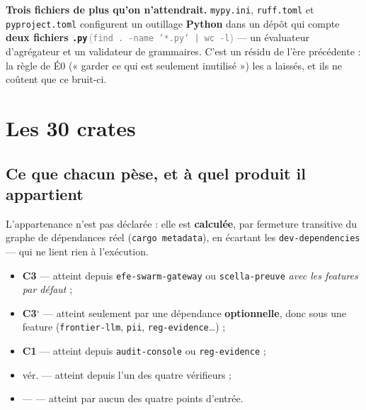 \documentclass[10pt]{report}
\newcommand{\code}[1]{\texttt{\small #1}}
\newcommand{\att}[1]{\textcolor{amber}{\textbf{#1}}}
\newcommand{\ctrois}{\textcolor{c3col}{\textbf{C3}}}
\newcommand{\cun}{\textcolor{c1col}{\textbf{C1}}}
\newcommand{\mesure}[2]{\textbf{#1}\,\footnotesize\textcolor{grey}{(#2)}\normalsize}
\begin{document}
\att{Trois fichiers de plus qu'on n'attendrait.} \code{mypy.ini}, \code{ruff.toml} et
\code{pyproject.toml} configurent un outillage \textbf{Python} dans un dépôt qui compte
\mesure{deux fichiers \code{.py}}{\code{find . -name '*.py' | wc -l}} --- un évaluateur d'agrégateur
et un validateur de grammaires. C'est un résidu de l'ère précédente : la règle de É0 (« garder ce qui
est seulement inutilisé ») les a laissés, et ils ne coûtent que ce bruit-ci.

\section{Les 30 crates}

\subsection{Ce que chacun pèse, et à quel produit il appartient}

L'appartenance n'est pas déclarée : elle est \textbf{calculée}, par fermeture transitive du graphe de
dépendances réel (\code{cargo metadata}), en écartant les \code{dev-dependencies} --- qui ne lient
rien à l'exécution.

\begin{itemize}[leftmargin=1.1em,itemsep=1pt]
\item \ctrois{} --- atteint depuis \code{efe-swarm-gateway} ou \code{scella-preuve} \emph{avec les features par défaut} ;
\item \ctrois{}$^{\circ}$ --- atteint seulement par une dépendance \textbf{optionnelle}, donc sous une feature (\code{frontier-llm}, \code{pii}, \code{reg-evidence}\ldots) ;
\item \cun{} --- atteint depuis \code{audit-console} ou \code{reg-evidence} ;
\item vér. --- atteint depuis l'un des quatre vérifieurs ;
\item --- --- atteint par aucun des quatre points d'entrée.
\end{itemize}
\end{document}
